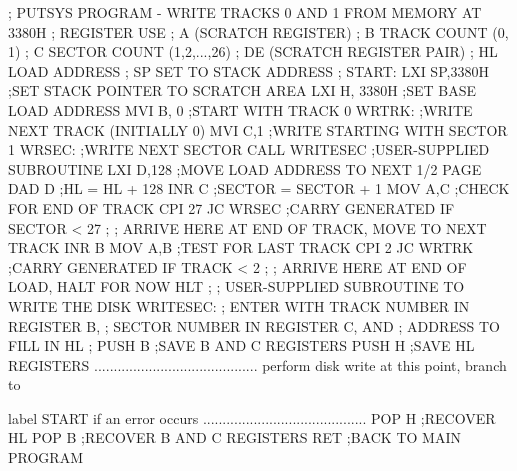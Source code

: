     ;   PUTSYS PROGRAM - WRITE TRACKS 0 AND 1 FROM MEMORY AT 3380H
    ;   REGISTER                 USE
    ;      A             (SCRATCH REGISTER)
    ;      B             TRACK COUNT (0, 1)
    ;      C             SECTOR COUNT (1,2,...,26)
    ;      DE            (SCRATCH REGISTER PAIR)
    ;      HL            LOAD ADDRESS
    ;      SP            SET TO STACK ADDRESS
    ;
    START: LXI   SP,3380H    ;SET STACK POINTER TO SCRATCH AREA
           LXI   H, 3380H    ;SET BASE LOAD ADDRESS
           MVI   B, 0        ;START WITH TRACK 0
    WRTRK:                   ;WRITE NEXT TRACK (INITIALLY 0)
           MVI   C,1         ;WRITE STARTING WITH SECTOR 1
    WRSEC:                   ;WRITE NEXT SECTOR
           CALL  WRITESEC     ;USER-SUPPLIED SUBROUTINE
           LXI   D,128       ;MOVE LOAD ADDRESS TO NEXT 1/2 PAGE
           DAD   D           ;HL = HL + 128
           INR   C           ;SECTOR = SECTOR + 1
           MOV   A,C         ;CHECK FOR END OF TRACK
           CPI   27
           JC    WRSEC       ;CARRY GENERATED IF SECTOR < 27
    ;
    ;   ARRIVE HERE AT END OF TRACK, MOVE TO NEXT TRACK
           INR   B
           MOV   A,B         ;TEST FOR LAST TRACK
           CPI   2
           JC    WRTRK       ;CARRY GENERATED IF TRACK < 2
    ;
    ;   ARRIVE HERE AT END OF LOAD, HALT FOR NOW
           HLT
    ;
    ;   USER-SUPPLIED SUBROUTINE TO WRITE THE DISK
    WRITESEC:
    ;   ENTER WITH TRACK NUMBER IN REGISTER B,
    ;         SECTOR NUMBER IN REGISTER C, AND
    ;         ADDRESS TO FILL IN HL
    ;
           PUSH   B          ;SAVE B AND C REGISTERS
           PUSH   H          ;SAVE HL REGISTERS
           ..........................................
           perform disk write at this point, branch to

           label START if an error occurs
           ..........................................
           POP    H          ;RECOVER HL
           POP    B          ;RECOVER B AND C REGISTERS
           RET               ;BACK TO MAIN PROGRAM

